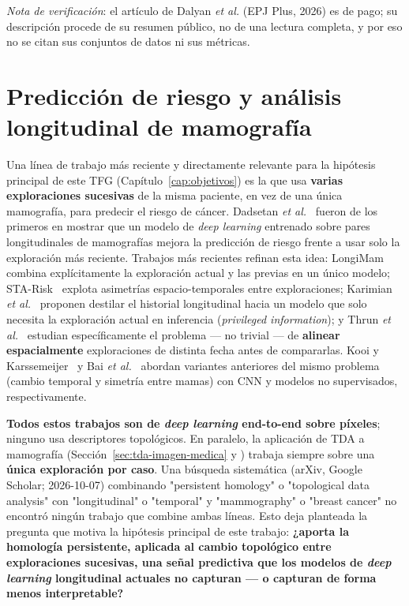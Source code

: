 \emph{Nota de verificación}: el artículo de Dalyan \textit{et al.} (EPJ Plus,
2026) es de pago; su descripción procede de su resumen público, no de una
lectura completa, y por eso no se citan sus conjuntos de datos ni sus
métricas.

\section{Predicción de riesgo y análisis longitudinal de mamografía}
\label{sec:estado-arte-longitudinal}
Una línea de trabajo más reciente y directamente relevante para la hipótesis
principal de este TFG (Capítulo~\ref{cap:objetivos}) es la que usa
\textbf{varias exploraciones sucesivas} de la misma paciente, en vez de una
única mamografía, para predecir el riesgo de cáncer. Dadsetan \textit{et
al.}~\cite{dadsetan2022longitudinal} fueron de los primeros en mostrar que un
modelo de \textit{deep learning} entrenado sobre pares longitudinales de
mamografías mejora la predicción de riesgo frente a usar solo la exploración
más reciente. Trabajos más recientes refinan esta idea: LongiMam
\cite{rakez2025longimam} combina explícitamente la exploración actual y las
previas en un único modelo; STA-Risk~\cite{zhou2025starisk} explota
asimetrías espacio-temporales entre exploraciones; Karimian \textit{et
al.}~\cite{karimian2026privileged} proponen destilar el historial longitudinal
hacia un modelo que solo necesita la exploración actual en inferencia
(\textit{privileged information}); y Thrun \textit{et
al.}~\cite{thrun2025alignment} estudian específicamente el problema --- no
trivial --- de \textbf{alinear espacialmente} exploraciones de distinta fecha
antes de compararlas. Kooi y Karssemeijer~\cite{kooi2017temporal} y Bai
\textit{et al.}~\cite{bai2023unsupervised} abordan variantes anteriores del
mismo problema (cambio temporal y simetría entre mamas) con CNN y modelos no
supervisados, respectivamente.

\textbf{Todos estos trabajos son de \textit{deep learning} end-to-end sobre
píxeles}; ninguno usa descriptores topológicos. En paralelo, la aplicación de
TDA a mamografía (Sección~\ref{sec:tda-imagen-medica} y
\cite{fanning2025wavelet}) trabaja siempre sobre una \textbf{única
exploración por caso}. Una búsqueda sistemática (arXiv, Google Scholar;
2026-10-07) combinando "persistent homology" o "topological data analysis" con
"longitudinal" o "temporal" y "mammography" o "breast cancer" no encontró ningún
trabajo que combine ambas líneas. Esto deja planteada la pregunta que motiva la hipótesis
principal de este trabajo: \textbf{¿aporta la homología persistente, aplicada
al cambio topológico entre exploraciones sucesivas, una señal predictiva que
los modelos de \textit{deep learning} longitudinal actuales no capturan --- o
capturan de forma menos interpretable?}

